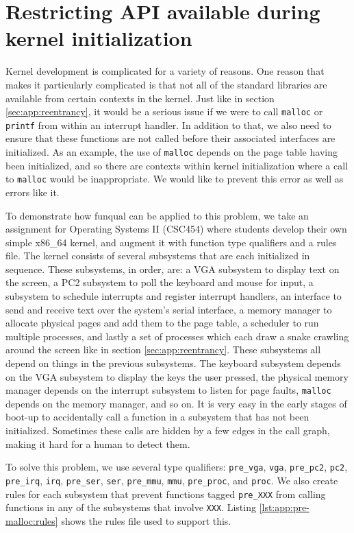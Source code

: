 \section{Restricting API available during kernel initialization}\label{sec:app:pre-malloc}

Kernel development is complicated for a variety of reasons.  One reason that makes it particularly complicated is that not all of the standard libraries are available from certain contexts in the kernel.  Just like in section \ref{sec:app:reentrancy}, it would be a serious issue if we were to call \lstinline{malloc} or \lstinline{printf} from within an interrupt handler.  In addition to that, we also need to ensure that these functions are not called before their associated interfaces are initialized.  As an example, the use of \lstinline{malloc} depends on the page table having been initialized, and so there are contexts within kernel initialization where a call to \lstinline{malloc} would be inappropriate.  We would like to prevent this error as well as errors like it. 

To demonstrate how funqual can be applied to this problem, we take an assignment for Operating Systems II (CSC454) where students develop their own simple x86\_64 kernel, and augment it with function type qualifiers and a rules file.  The kernel consists of several subsystems that are each initialized in sequence.  These subsystems, in order, are: a VGA subsystem to display text on the screen, a PC2 subsystem to poll the keyboard and mouse for input, a subsystem to schedule interrupts and register interrupt handlers, an interface to send and receive text over the system's serial interface, a memory manager to allocate physical pages and add them to the page table, a scheduler to run multiple processes, and lastly a set of processes which each draw a snake crawling around the screen like in section \ref{sec:app:reentrancy}.  These subsystems all depend on things in the previous subsystems.  The keyboard subsystem depends on the VGA subsystem to display the keys the user pressed, the physical memory manager depends on the interrupt subsystem to listen for page faults, \lstinline{malloc} depends on the memory manager, and so on.  It is very easy in the early stages of boot-up to accidentally call a function in a subsystem that has not been initialized.  Sometimes these calls are hidden by a few edges in the call graph, making it hard for a human to detect them.  

To solve this problem, we use several type qualifiers:  \lstinline{pre_vga}, \lstinline{vga}, \lstinline{pre_pc2}, \lstinline{pc2}, \lstinline{pre_irq}, \lstinline{irq}, \lstinline{pre_ser}, \lstinline{ser}, \lstinline{pre_mmu}, \lstinline{mmu}, \lstinline{pre_proc}, and \lstinline{proc}.  We also create rules for each subsystem that prevent functions tagged \lstinline{pre_XXX} from calling functions in any of the subsystems that involve \lstinline{XXX}.  Listing \ref{lst:app:pre-malloc:rules} shows the rules file used to support this.  

